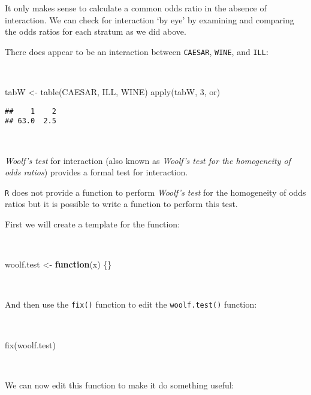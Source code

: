 \documentclass[
  12pt,
  a4paper]{book}
\newenvironment{Shaded}{\begin{snugshade}}{\end{snugshade}}
\newcommand{\ControlFlowTok}[1]{\textcolor[rgb]{0.13,0.29,0.53}{\textbf{#1}}}
\newcommand{\DecValTok}[1]{\textcolor[rgb]{0.00,0.00,0.81}{#1}}
\newcommand{\FunctionTok}[1]{\textcolor[rgb]{0.00,0.00,0.00}{#1}}
\newcommand{\NormalTok}[1]{#1}
\newcommand{\OtherTok}[1]{\textcolor[rgb]{0.56,0.35,0.01}{#1}}
\begin{document}
It only makes sense to calculate a common odds ratio in the absence of interaction. We can check for interaction `by eye' by examining and comparing the odds ratios for each stratum as we did above.

\newpage

There does appear to be an interaction between \texttt{CAESAR}, \texttt{WINE}, and \texttt{ILL}:

~

\begin{Shaded}
\begin{Highlighting}[]
\NormalTok{tabW }\OtherTok{\textless{}{-}} \FunctionTok{table}\NormalTok{(CAESAR, ILL, WINE)}
\FunctionTok{apply}\NormalTok{(tabW, }\DecValTok{3}\NormalTok{, or)}
\end{Highlighting}
\end{Shaded}

\begin{verbatim}
##    1    2 
## 63.0  2.5
\end{verbatim}

~

\emph{Woolf's test} for interaction (also known as \emph{Woolf's test for the homogeneity of odds ratios}) provides a formal test for interaction.

\texttt{R} does not provide a function to perform \emph{Woolf's test} for the homogeneity of odds ratios but it is possible to write a function to perform this test.

First we will create a template for the function:

~

\begin{Shaded}
\begin{Highlighting}[]
\NormalTok{woolf.test }\OtherTok{\textless{}{-}} \ControlFlowTok{function}\NormalTok{(x) \{\}}
\end{Highlighting}
\end{Shaded}

~

And then use the \texttt{fix()} function to edit the \texttt{woolf.test()} function:

~

\begin{Shaded}
\begin{Highlighting}[]
\FunctionTok{fix}\NormalTok{(woolf.test)}
\end{Highlighting}
\end{Shaded}

~

We can now edit this function to make it do something useful:
\end{document}
